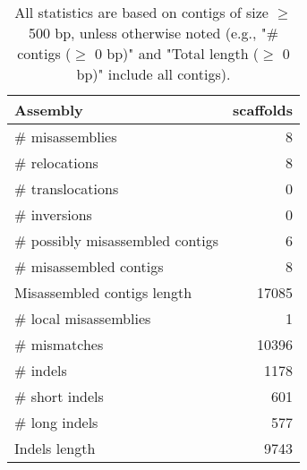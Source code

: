 \documentclass[12pt,a4paper]{article}
\begin{document}
\begin{table}[ht]
\begin{center}
\caption{All statistics are based on contigs of size $\geq$ 500 bp, unless otherwise noted (e.g., "\# contigs ($\geq$ 0 bp)" and "Total length ($\geq$ 0 bp)" include all contigs).}
\begin{tabular}{|l*{1}{|r}|}
\hline
Assembly & scaffolds \\ \hline
\# misassemblies & 8 \\ \hline
\hspace{5mm}\# relocations & 8 \\ \hline
\hspace{5mm}\# translocations & 0 \\ \hline
\hspace{5mm}\# inversions & 0 \\ \hline
\# possibly misassembled contigs & 6 \\ \hline
\# misassembled contigs & 8 \\ \hline
Misassembled contigs length & 17085 \\ \hline
\# local misassemblies & 1 \\ \hline
\# mismatches & 10396 \\ \hline
\# indels & 1178 \\ \hline
\hspace{5mm}\# short indels & 601 \\ \hline
\hspace{5mm}\# long indels & 577 \\ \hline
Indels length & 9743 \\ \hline
\end{tabular}
\end{center}
\end{table}
\end{document}

